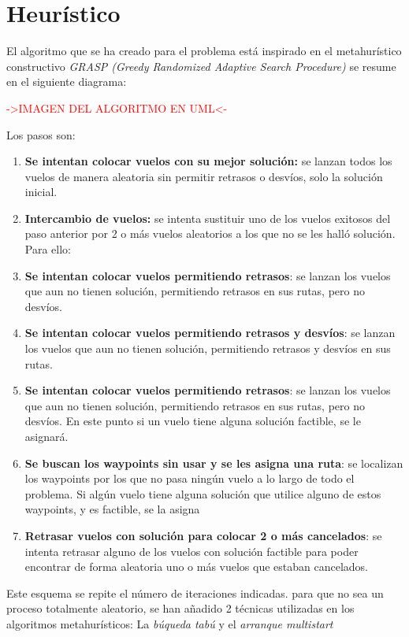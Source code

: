 \section{Heurístico}
El algoritmo que se ha creado para el problema está inspirado en el metahurístico constructivo \textit{GRASP (Greedy Randomized Adaptive Search Procedure)} se resume en el siguiente diagrama:

\textcolor{red}{->IMAGEN DEL ALGORITMO EN UML<-}


Los pasos son:
\begin{enumerate}
	
	\item \textbf{Se intentan colocar vuelos con su mejor solución:} se lanzan todos los vuelos de manera aleatoria sin permitir retrasos o desvíos, solo la solución inicial.
	
	\item \textbf{Intercambio de vuelos: } se intenta sustituir uno de los vuelos exitosos del paso anterior por 2 o más vuelos aleatorios a los que no se les halló solución. Para ello:
	
	\item \textbf{Se intentan colocar vuelos permitiendo retrasos}: se lanzan los vuelos que aun no tienen solución, permitiendo retrasos en sus rutas, pero no desvíos.
	
	\item \textbf{Se intentan colocar vuelos permitiendo retrasos y desvíos}: se lanzan los vuelos que aun no tienen solución, permitiendo retrasos y desvíos en sus rutas.
	
	\item \textbf{Se intentan colocar vuelos permitiendo retrasos}: se lanzan los vuelos que aun no tienen solución, permitiendo retrasos en sus rutas, pero no desvíos. En este punto si un vuelo tiene alguna solución factible, se le asignará.
	
	\item \textbf{Se buscan los waypoints sin usar y se les asigna una ruta}: se localizan los waypoints por los que no pasa ningún vuelo a lo largo de todo el problema. Si algún vuelo tiene alguna solución que utilice alguno de estos waypoints, y es factible, se la asigna
	
	\item \textbf{Retrasar vuelos con solución para colocar 2 o más cancelados}: se intenta retrasar alguno de los vuelos con solución factible para poder encontrar de forma aleatoria uno o más vuelos que estaban cancelados.
	
\end{enumerate}

Este esquema se repite el número de iteraciones indicadas. para que no sea un proceso totalmente aleatorio, se han añadido 2 técnicas utilizadas en los algoritmos metahurísticos: La \textit{búqueda tabú} y el \textit{arranque multistart}